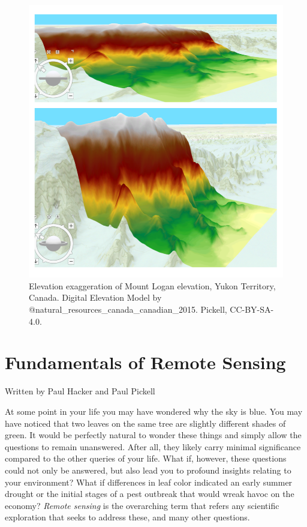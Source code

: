 \documentclass[
]{book}
\begin{document}
\begin{figure}
\includegraphics[width=0.75\linewidth]{images/09-mount-logan-exaggeration} \caption{Elevation exaggeration of Mount Logan elevation, Yukon Territory, Canada. Digital Elevation Model by @natural_resources_canada_canadian_2015. Pickell, CC-BY-SA-4.0.}\label{fig:9-mount-logan-exaggeration}
\end{figure}

\chapter{Fundamentals of Remote Sensing}\label{fundamentals-of-remote-sensing}

Written by
Paul Hacker and Paul Pickell

At some point in your life you may have wondered why the sky is blue. You may have noticed that two leaves on the same tree are slightly different shades of green. It would be perfectly natural to wonder these things and simply allow the questions to remain unanswered. After all, they likely carry minimal significance compared to the other queries of your life. What if, however, these questions could not only be answered, but also lead you to profound insights relating to your environment? What if differences in leaf color indicated an early summer drought or the initial stages of a pest outbreak that would wreak havoc on the economy? \emph{Remote sensing} is the overarching term that refers any scientific exploration that seeks to address these, and many other questions.
\end{document}
